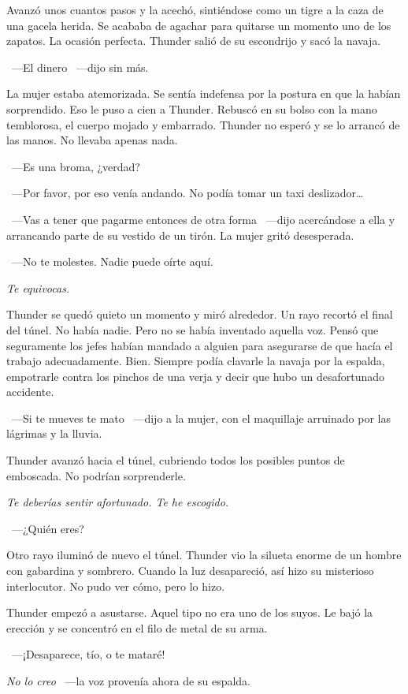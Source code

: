 Avanzó unos cuantos pasos y la acechó, sintiéndose como un tigre a la caza de una gacela herida. Se acababa de agachar para quitarse un momento uno de los zapatos. La ocasión perfecta. Thunder salió de su escondrijo y sacó la navaja.

~---El dinero ~---dijo sin más.

La mujer estaba atemorizada. Se sentía indefensa por la postura en que la habían sorprendido. Eso le puso a cien a Thunder. Rebuscó en su bolso con la mano temblorosa, el cuerpo mojado y embarrado. Thunder no esperó y se lo arrancó de las manos. No llevaba apenas nada.

~---Es una broma, ¿verdad?

~---Por favor, por eso venía andando. No podía tomar un taxi deslizador\dots

~---Vas a tener que pagarme entonces de otra forma ~---dijo acercándose a ella y arrancando parte de su vestido de un tirón. La mujer gritó desesperada.

~---No te molestes. Nadie puede oírte aquí.

\emph{Te equivocas.}

Thunder se quedó quieto un momento y miró alrededor. Un rayo recortó el final del túnel. No había nadie. Pero no se había inventado aquella voz. Pensó que seguramente los jefes habían mandado a alguien para asegurarse de que hacía el trabajo adecuadamente. Bien. Siempre podía clavarle la navaja por la espalda, empotrarle contra los pinchos de una verja y decir que hubo un desafortunado accidente.

~---Si te mueves te mato ~---dijo a la mujer, con el maquillaje arruinado por las lágrimas y la lluvia.

Thunder avanzó hacia el túnel, cubriendo todos los posibles puntos de emboscada. No podrían sorprenderle.

\emph{Te deberías sentir afortunado. Te he escogido.}

~---¿Quién eres?

Otro rayo iluminó de nuevo el túnel. Thunder vio la silueta enorme de un hombre con gabardina y sombrero. Cuando la luz desapareció, así hizo su misterioso interlocutor. No pudo ver cómo, pero lo hizo.

Thunder empezó a asustarse. Aquel tipo no era uno de los suyos. Le bajó la erección y se concentró en el filo de metal de su arma.

~---¡Desaparece, tío, o te mataré!

\emph{No lo creo} ~---la voz provenía ahora de su espalda.

